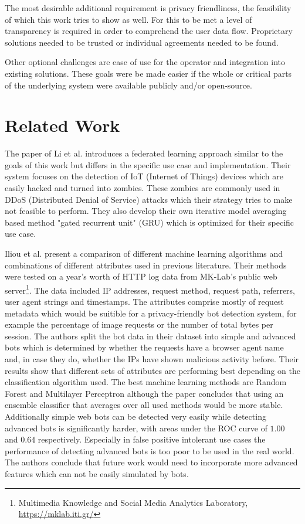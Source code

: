 \documentclass[
    fontsize=12pt,
    headings=small,
    parskip=half,           %
    bibliography=totoc,
    numbers=noenddot,       %
    open=any,               %
    final,                   %
    table
]{scrreprt}
\begin{document}
The most desirable additional requirement is privacy friendliness, the feasibility of which this work tries to show as well. For this to be met a level of transparency is required in order to comprehend the user data flow. Proprietary solutions needed to be trusted or individual agreements needed to be found.

Other optional challenges are ease of use for the operator and integration into existing solutions. These goals were be made easier if the whole or critical parts of the underlying system were available publicly and/or open-source.

\section{Related Work}

The paper of Li et al. \cite{LiJi2021} introduces a federated learning approach similar to the goals of this work but differs in the specific use case and implementation. Their system focuses on the detection of IoT (Internet of Things) devices which are easily hacked and turned into zombies. These zombies are commonly used in DDoS (Distributed Denial of Service) attacks which their strategy tries to make not feasible to perform. They also develop their own iterative model averaging based method "gated recurrent unit" (GRU) which is optimized for their specific use case.

Iliou et al. \cite{10.1145/3339252.3339267} present a comparison of different machine learning algorithms and combinations of different attributes used in previous literature. Their methods were tested on a year's worth of HTTP log data from MK-Lab's public web server\footnote{Multimedia Knowledge and Social Media Analytics Laboratory, \url{https://mklab.iti.gr/}}. The data included IP addresses, request method, request path, referrers, user agent strings and timestamps. The attributes comprise mostly of request metadata which would be suitible for a privacy-friendly bot detection system, for example the percentage of image requests or the number of total bytes per session. The authors split the bot data in their dataset into simple and advanced bots which is determined by whether the requests have a browser agent name and, in case they do, whether the IPs have shown malicious activity before. Their results show that different sets of attributes are performing best depending on the classification algorithm used. The best machine learning methods are Random Forest and Multilayer Perceptron although the paper concludes that using an ensemble classifier that averages over all used methods would be more stable. Additionally simple web bots can be detected very easily while detecting advanced bots is significantly harder, with areas under the ROC curve of $1.00$ and $0.64$ respectively. Especially in false positive intolerant use cases the performance of detecting advanced bots is too poor to be used in the real world. The authors conclude that future work would need to incorporate more advanced features which can not be easily simulated by bots.
\end{document}
